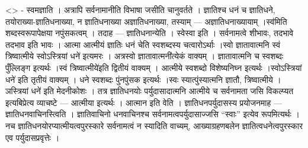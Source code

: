\textless{}\textgreater{} - स्वमज्ञाति । अत्रापि सर्वनामानीति विभाषा
जसीति चानुवर्तते । ज्ञातिश्च धनं च ज्ञातिधने, तयोराख्या-ज्ञातिधनाख्या, न
ज्ञातिधनाख्या अज्ञातिधनाख्या, तस्याम् --- अज्ञातिधनाख्यायाम् ।स्व॑मिति
शब्दस्वरूपापेक्षया नपुंसकत्वम् । तदाह --- ज्ञातिधनान्येति । स्वेस्वा इति
। सर्वनामत्वे शीभावः, तदभावे तदभाव इति भावः । आत्मा आत्मीयं ज्ञातिः धनं
चेति स्वशब्दस्य चत्वारोऽर्थाः ।स्वो ज्ञातावात्मनि स्वं त्रिष्वात्मीये
स्वोऽस्त्रियां धने॑ इत्यमरः । अत्रस्वो ज्ञातावात्मनी॑त्येकं वाक्यम् ।
ज्ञातावात्मनि च स्वशब्दः पुँल्लिङ्ग इत्यर्थः ।स्वं त्रिष्वात्मीये॑इति
द्वितीयं वाक्यम् । आत्मीये स्वशब्दो विशेष्यनिघ्न इत्यर्थः
।स्वोऽस्त्रियां धने॑ इति तृतीयं वाक्यम् । धने स्वशब्दः पुंनपुंसक
इत्यर्थः ।स्वः स्यात्पुंस्यात्मनि ज्ञातौ, त्रिष्वात्मीये ।ञस्त्रियां
धने॑ इति मेदनीकोशः । तत्र ज्ञातिधनयोः पर्युदासादात्मनि आत्मीये च
सर्वनामता जसि विकल्प्यत इत्यबिप्रेत्य व्याचष्टे --- आत्मीया इत्यर्थः ।
आत्मान इति वेति । ज्ञातिधनपर्युदासस्य प्रयोजनमाह ---
ज्ञातिधनवाचिनस्त्विति । ज्ञातिवाचिनो धनवाचिनश्च सर्वनामत्वपर्युदासाज्जसि
``स्वाः'' इत्येव रूपमित्यर्थः । नच ज्ञातिधनयोरप्यात्मीयत्वपुरस्कारे
सर्वनामत्वं न स्यादिति वाच्यम्, आख्याग्रहणबलेन ज्ञातित्वधनेत्वपुरस्कार
एव पर्युदासप्रवृत्तेः ।
